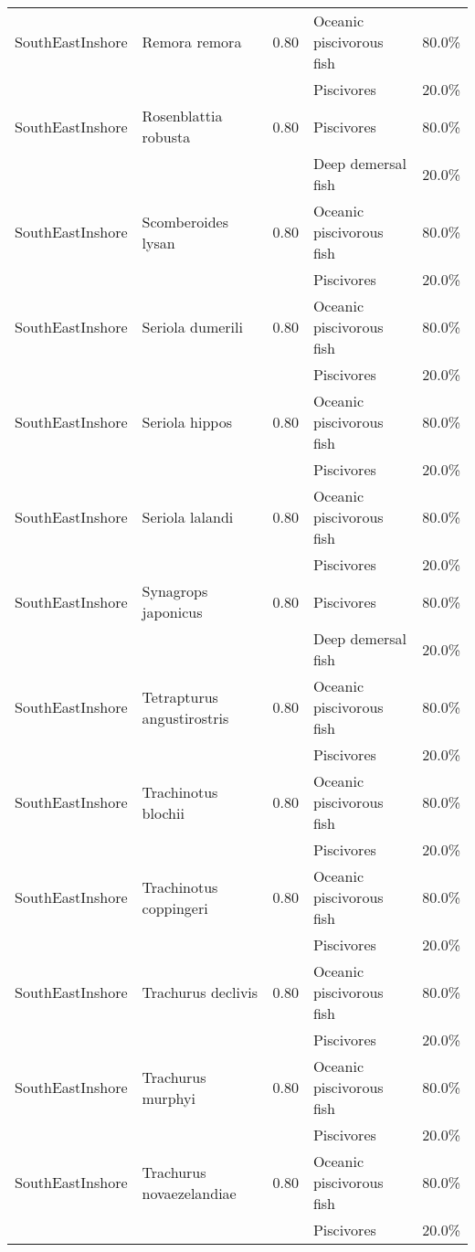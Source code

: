 \begin{longtable}{llcll}
\hline
SouthEastInshore & Remora remora & 0.80 & Oceanic piscivorous fish & 80.0\% \\
& & & Piscivores & 20.0\% \\
\hline
SouthEastInshore & Rosenblattia robusta & 0.80 & Piscivores & 80.0\% \\
& & & Deep demersal fish & 20.0\% \\
\hline
SouthEastInshore & Scomberoides lysan & 0.80 & Oceanic piscivorous fish & 80.0\% \\
& & & Piscivores & 20.0\% \\
\hline
SouthEastInshore & Seriola dumerili & 0.80 & Oceanic piscivorous fish & 80.0\% \\
& & & Piscivores & 20.0\% \\
\hline
SouthEastInshore & Seriola hippos & 0.80 & Oceanic piscivorous fish & 80.0\% \\
& & & Piscivores & 20.0\% \\
\hline
SouthEastInshore & Seriola lalandi & 0.80 & Oceanic piscivorous fish & 80.0\% \\
& & & Piscivores & 20.0\% \\
\hline
SouthEastInshore & Synagrops japonicus & 0.80 & Piscivores & 80.0\% \\
& & & Deep demersal fish & 20.0\% \\
\hline
SouthEastInshore & Tetrapturus angustirostris & 0.80 & Oceanic piscivorous fish & 80.0\% \\
& & & Piscivores & 20.0\% \\
\hline
SouthEastInshore & Trachinotus blochii & 0.80 & Oceanic piscivorous fish & 80.0\% \\
& & & Piscivores & 20.0\% \\
\hline
SouthEastInshore & Trachinotus coppingeri & 0.80 & Oceanic piscivorous fish & 80.0\% \\
& & & Piscivores & 20.0\% \\
\hline
SouthEastInshore & Trachurus declivis & 0.80 & Oceanic piscivorous fish & 80.0\% \\
& & & Piscivores & 20.0\% \\
\hline
SouthEastInshore & Trachurus murphyi & 0.80 & Oceanic piscivorous fish & 80.0\% \\
& & & Piscivores & 20.0\% \\
\hline
SouthEastInshore & Trachurus novaezelandiae & 0.80 & Oceanic piscivorous fish & 80.0\% \\
& & & Piscivores & 20.0\% \\
\hline

\end{longtable}
